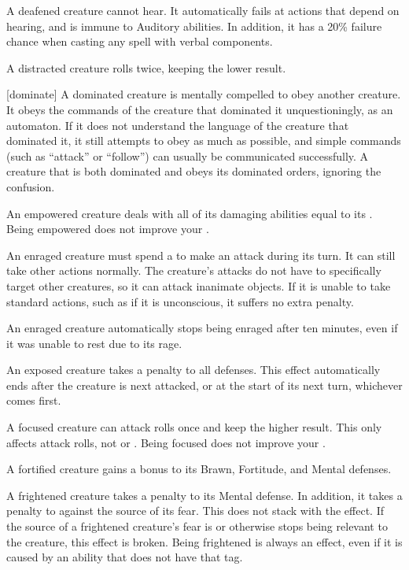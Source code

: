    A deafened creature cannot hear.
  It automatically fails at actions that depend on hearing, and is immune to Auditory abilities.
  In addition, it has a 20\% failure chance when casting any spell with verbal components.

   A distracted creature rolls  twice, keeping the lower result.

  [dominate] A dominated creature is mentally compelled to obey another creature.
  It obeys the commands of the creature that dominated it unquestioningly, as an automaton.
  If it does not understand the language of the creature that dominated it, it still attempts to obey as much as possible, and simple commands (such as ``attack'' or ``follow'') can usually be communicated successfully.
  A creature that is both dominated and \confused obeys its dominated orders, ignoring the confusion.

   An empowered creature deals  with all of its damaging abilities equal to its .
  Being empowered does not improve your .

   An enraged creature must spend a  to make an attack during its turn.
  It can still take other actions normally.
  The creature's attacks do not have to specifically target other creatures, so it can attack inanimate objects.
  If it is unable to take standard actions, such as if it is unconscious, it suffers no extra penalty.

  An enraged creature automatically stops being enraged after ten minutes, even if it was unable to rest due to its rage.

   An exposed creature takes a  penalty to all defenses.
  This effect automatically ends after the creature is next attacked, or at the start of its next turn, whichever comes first.

   A focused creature can  attack rolls once and keep the higher result.
  This only affects attack rolls, not  or .
  Being focused does not improve your .

   A fortified creature gains a  bonus to its Brawn, Fortitude, and Mental defenses.

   A frightened creature takes a  penalty to its Mental defense.
  In addition, it takes a  penalty to  against the source of its fear.
  This does not stack with the \panicked effect.
  If the source of a frightened creature's fear is  or otherwise stops being relevant to the creature, this effect is broken.
  Being frightened is always an  effect, even if it is caused by an ability that does not have that tag.


